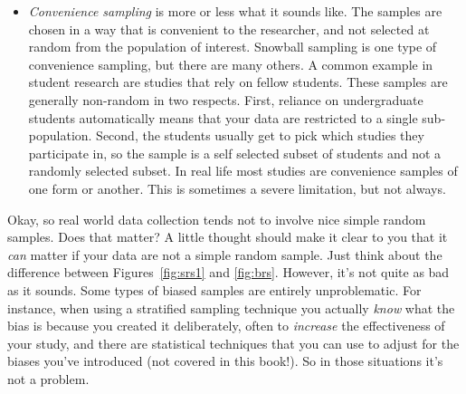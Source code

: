 \begin{itemize}
\item {\it Convenience sampling} is more or less what it sounds like. The samples are chosen in a way that is convenient to the researcher, and not selected at random from the population of interest. Snowball sampling is one type of convenience sampling, but there are many others. A common example in student research are studies that rely on fellow students. These samples are generally non-random in two respects. First, reliance on undergraduate students automatically means that your data are restricted to a single sub-population. Second, the students usually get to pick which studies they participate in, so the sample is a self selected subset of students and not a randomly selected subset. In real life most studies are convenience samples of one form or another. This is sometimes a severe limitation, but not always.
\end{itemize}


Okay, so real world data collection tends not to involve nice simple random samples. Does that matter? A little thought should make it clear to you that it {\it can} matter if your data are not a simple random sample. Just think about the difference between Figures~\ref{fig:srs1} and \ref{fig:brs}. However, it's not quite as bad as it sounds. Some types of biased samples are entirely unproblematic. For instance, when using a stratified sampling technique you actually {\it know} what the bias is because you created it deliberately, often to {\it increase} the effectiveness of your study, and there are statistical techniques that you can use to adjust for the biases you've introduced (not covered in this book!). So in those situations it's not a problem. 

